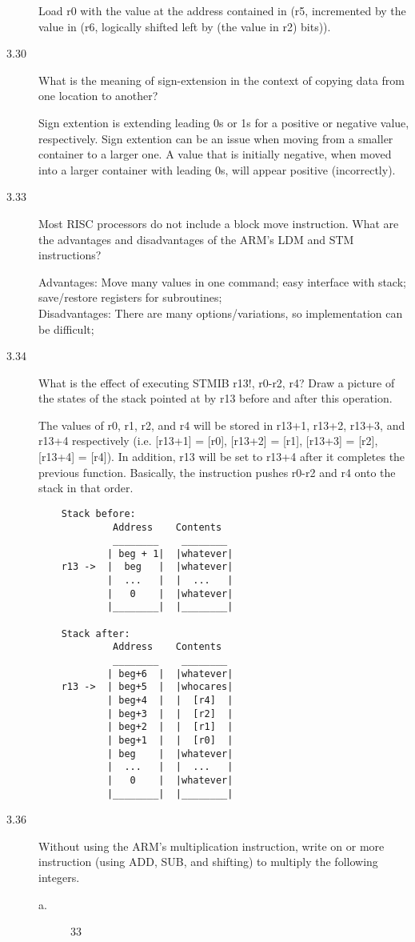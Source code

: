 \documentclass[letterpaper,10pt,titlepage]{article}
\begin{document}
\begin{description}
    Load r0 with the value at the address contained in (r5, incremented by the value in (r6, logically shifted left by (the value in r2) bits)).
    \item[3.30] What is the meaning of sign-extension in the context of copying data from one location to another?
    
    Sign extention is extending leading 0s or 1s for a positive or negative value, respectively. Sign extention can be an issue when moving from a smaller container to a larger one. A value that is initially negative, when moved into a larger container with leading 0s, will appear positive (incorrectly).
    \item[3.33] Most RISC processors do not include a block move instruction. What are the advantages and disadvantages of the ARM's LDM and STM instructions?
    
    Advantages: Move many values in one command; easy interface with stack; save/restore registers for subroutines;\\
    Disadvantages: There are many options/variations, so implementation can be difficult;
    \item[3.34] What is the effect of executing STMIB r13!, {r0-r2, r4}? Draw a picture of the states of the stack pointed at by r13 before and after this operation.
    
    The values of r0, r1, r2, and r4 will be stored in r13+1, r13+2, r13+3, and r13+4 respectively (i.e. [r13+1] = [r0], [r13+2] = [r1], [r13+3] = [r2], [r13+4] = [r4]). In addition, r13 will be set to r13+4 after it completes the previous function. Basically, the instruction pushes r0-r2 and r4 onto the stack in that order. 
    
    \begin{lstlisting}
    Stack before:
             Address    Contents
             ________    ________
            | beg + 1|  |whatever|
    r13 ->  |  beg   |  |whatever|
            |  ...   |  |  ...   |
            |   0    |  |whatever|
            |________|  |________|
    
    Stack after:
             Address    Contents
             ________    ________
            | beg+6  |  |whatever|
    r13 ->  | beg+5  |  |whocares|
            | beg+4  |  |  [r4]  |
            | beg+3  |  |  [r2]  |
            | beg+2  |  |  [r1]  |
            | beg+1  |  |  [r0]  |
            | beg    |  |whatever|
            |  ...   |  |  ...   |
            |   0    |  |whatever|
            |________|  |________|
    \end{lstlisting}
    \item[3.36] Without using the ARM's multiplication instruction, write on or more instruction (using ADD, SUB, and shifting) to multiply the following integers.
    \begin{description}
        \item[a.] 33
        

\end{description}
\end{description}
\end{document}
